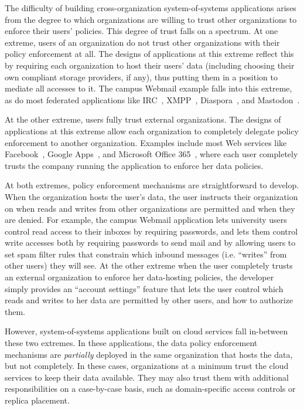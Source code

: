 The difficulty of building cross-organization system-of-systems applications arises from the
degree to which organizations are willing to trust other organizations to enforce
their users' policies.  This degree of trust falls on a spectrum.
At one extreme, users of an organization do not trust other organizations with
their policy enforcement at all.  The designs of applications at this extreme reflect this by requiring
each organization to host their users' data (including choosing their own compliant storage
providers, if any), thus putting them in a position to
mediate all accesses to it.
The campus Webmail example falls into this extreme, as do most federated
applications like IRC~\cite{irc}, XMPP~\cite{xmpp},
Diaspora~\cite{diaspora}, and Mastodon~\cite{mastadon}.

At the other extreme,
users fully trust external organizations.
The designs of applications at this extreme allow each organization to completely delegate
policy enforcement to another organization.  Examples include most Web services like 
Facebook~\cite{facebook}, Google Apps~\cite{gapps}, and Microsoft
Office 365~\cite{microsoft-apps}, where each user completely trusts the company running
the application to enforce her data policies.

At both extremes, policy enforcement mechanisms are
straightforward to develop.  When the organization hosts the user's data, the user 
instructs their organization on when reads and writes from other
organizations are permitted and when they are denied.
For example, the campus Webmail application lets university users
control read access to their inboxes by requiring passwords, and lets
them control write accesses both by requiring passwords to send mail
and by allowing users to
set spam filter rules that constrain which inbound messages
(i.e. ``writes'' from other users) they will
see.  At the other extreme when the user completely trusts an external organization to enforce her
data-hosting policies, the developer simply provides an ``account settings''
feature that lets the user control which reads and writes to her data are
permitted by other users, and how to authorize them.

However, system-of-systems applications built on cloud services
fall in-between these two extremes.  In these applications, the data policy
enforcement mechanisms are \emph{partially} deployed in the same
organization that hosts the data, but not completely.  In these cases,
organizations at a minimum trust the cloud services to keep their data available.
They may also trust them with additional
responsibilities on a case-by-case basis,
such as domain-specific access controls or replica placement.

